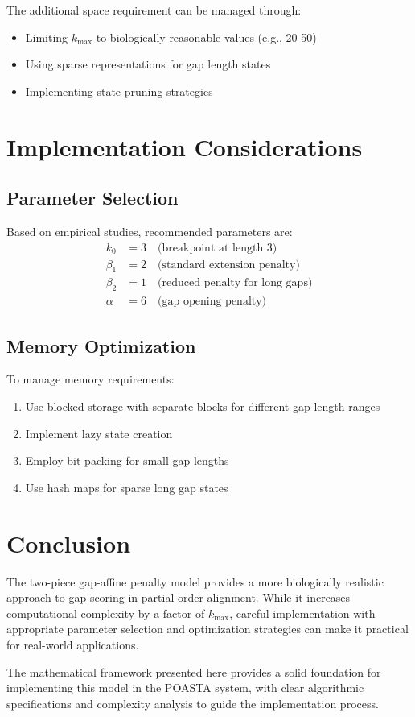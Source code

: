 \documentclass[11pt]{article}
\begin{document}
The additional space requirement can be managed through:
\begin{itemize}
\item Limiting $k_{\max}$ to biologically reasonable values (e.g., 20-50)
\item Using sparse representations for gap length states
\item Implementing state pruning strategies
\end{itemize}

\section{Implementation Considerations}

\subsection{Parameter Selection}

Based on empirical studies, recommended parameters are:
\begin{align}
k_0 &= 3 \quad \text{(breakpoint at length 3)} \\
\beta_1 &= 2 \quad \text{(standard extension penalty)} \\
\beta_2 &= 1 \quad \text{(reduced penalty for long gaps)} \\
\alpha &= 6 \quad \text{(gap opening penalty)}
\end{align}

\subsection{Memory Optimization}

To manage memory requirements:
\begin{enumerate}
\item Use blocked storage with separate blocks for different gap length ranges
\item Implement lazy state creation
\item Employ bit-packing for small gap lengths
\item Use hash maps for sparse long gap states
\end{enumerate}

\section{Conclusion}

The two-piece gap-affine penalty model provides a more biologically realistic approach to gap scoring in partial order alignment. While it increases computational complexity by a factor of $k_{\max}$, careful implementation with appropriate parameter selection and optimization strategies can make it practical for real-world applications.

The mathematical framework presented here provides a solid foundation for implementing this model in the POASTA system, with clear algorithmic specifications and complexity analysis to guide the implementation process.
\end{document}
